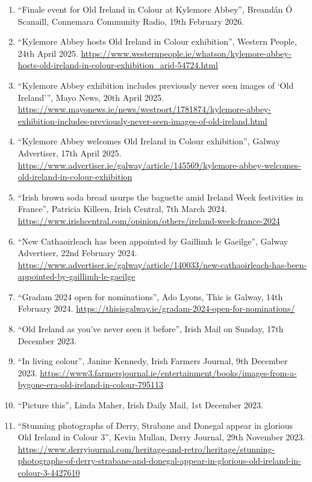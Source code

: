 \documentclass[10pt,a4paper]{res} %
\begin{document}
\begin{resume}
{\begin{enumerate} \itemsep -2pt
\item ``Finale event for Old Ireland in Colour at Kylemore Abbey'', Breand\'{a}n \'{O} Scanaill, Connemara Community Radio, 19th February 2026.
\item ``Kylemore Abbey hosts Old Ireland in Colour exhibition'', Western People, 24th April 2025. \url{https://www.westernpeople.ie/whatson/kylemore-abbey-hosts-old-ireland-in-colour-exhibition_arid-54724.html}
\item ``Kylemore Abbey exhibition includes previously never seen images of {`Old Ireland'}'', Mayo News, 20th April 2025. \url{https://www.mayonews.ie/news/westport/1781874/kylemore-abbey-exhibition-includes-previously-never-seen-images-of-old-ireland.html}
\item ``Kylemore Abbey welcomes Old Ireland in Colour exhibition'', Galway Advertiser, 17th April 2025. \url{https://www.advertiser.ie/galway/article/145569/kylemore-abbey-welcomes-old-ireland-in-colour-exhibition}
\item ``Irish brown soda bread usurps the baguette amid Ireland Week festivities in France'', Patricia Killeen, Irish Central, 7th March 2024. \url{https://www.irishcentral.com/opinion/others/ireland-week-france-2024}
\item ``New Cathaoirleach has been appointed by Gaillimh le Gaeilge'', Galway Advertiser, 22nd February 2024. \url{https://www.advertiser.ie/galway/article/140033/new-cathaoirleach-has-been-appointed-by-gaillimh-le-gaeilge}
\item ``Gradam 2024 open for nominations'', Ado Lyons, This is Galway, 14th February 2024. \url{https://thisisgalway.ie/gradam-2024-open-for-nominations/}
\item ``Old Ireland as you've never seen it before'', Irish Mail on Sunday, 17th December 2023.
\item ``In living colour'', Janine Kennedy, Irish Farmers Journal, 9th December 2023. \url{https://www3.farmersjournal.ie/entertainment/books/images-from-a-bygone-era-old-ireland-in-colour-795113}
\item ``Picture this'', Linda Maher, Irish Daily Mail, 1st December 2023.
\item ``Stunning photographs of Derry, Strabane and Donegal appear in glorious Old Ireland in Colour 3'', Kevin Mullan, Derry Journal, 29th November 2023. \url{https://www.derryjournal.com/heritage-and-retro/heritage/stunning-photographs-of-derry-strabane-and-donegal-appear-in-glorious-old-ireland-in-colour-3-4427610}

\end{enumerate}}
\end{resume}
\end{document}
